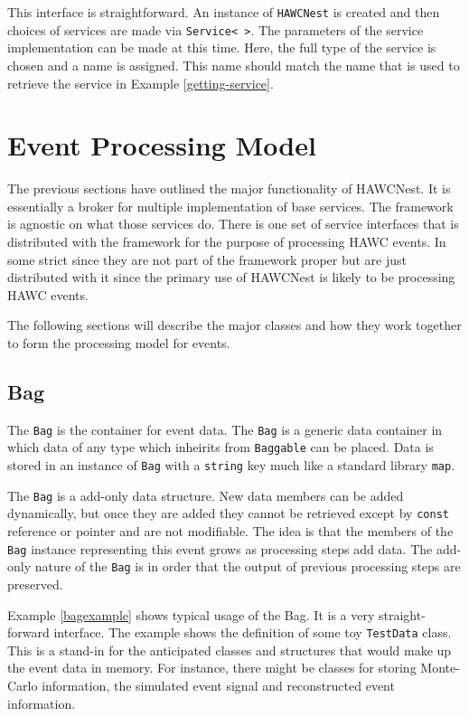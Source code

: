 \documentclass[12pt]{article}
\begin{document}
This interface is straightforward.  An instance of {\tt HAWCNest} is created 
and then
choices of services are made via {\tt Service< >}.  
The parameters of the service implementation can be made at this time.
Here, the full type
of the service is chosen and a name is assigned.  This name should match
the name that is used to retrieve the service in Example 
\ref{getting-service}.

\section{Event Processing Model}
\label{processingsection}

The previous sections have outlined the major functionality of HAWCNest. It
is essentially a broker for multiple implementation of base services. The 
framework is agnostic on what those services do. There is one set of service
interfaces that is distributed with the framework for the purpose of processing
HAWC events.  In some strict since they are not part of the framework 
proper but are just distributed with it since the primary use of HAWCNest
is likely to be processing HAWC events. 

The following sections will describe the major classes and how they 
work together to form the processing model for events.

\subsection{Bag}

The {\tt Bag} is the container for event data. The {\tt Bag} is a generic data
container in which data of any type which inheirits from {\tt Baggable} can
be placed. Data is stored in an instance of {\tt Bag} with a {\tt string}
key much like a standard library {\tt map}. 

The {\tt Bag} is a add-only data structure. New data members can be added
dynamically, but once they are added they cannot be retrieved except by 
{\tt const} reference or pointer and are not modifiable. The idea is that the
members of the {\tt Bag} instance representing this event grows as 
processing steps add data. The add-only nature of the {\tt Bag} is in order
that the output of previous processing steps are preserved.

Example \ref{bagexample} shows typical usage of the Bag. It is a very 
straight-forward interface. The example shows the definition of some 
toy {\tt TestData} class. This is a stand-in for the anticipated classes
and structures
that would make up the event data in memory. For instance, there might be 
classes for storing Monte-Carlo information, the simulated 
event signal and reconstructed event information.
\end{document}
